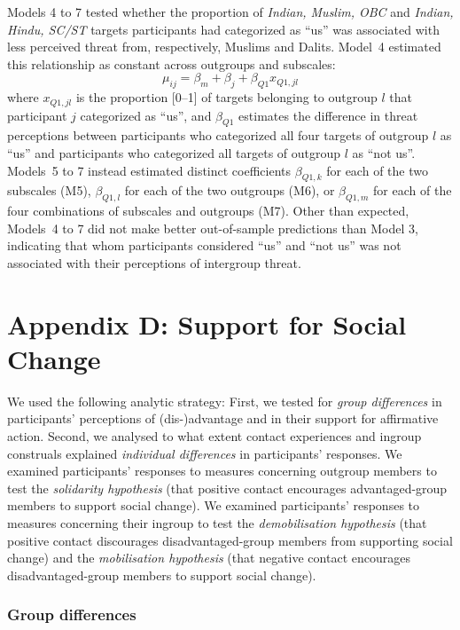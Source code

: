 \documentclass[12pt, a4paper]{article}
\begin{document}
Models 4 to 7 tested whether the proportion of \emph{Indian, Muslim, OBC} and \emph{Indian, Hindu, SC/ST} targets participants had categorized as ``us'' was associated with less perceived threat from, respectively, Muslims and Dalits. Model~4 estimated this relationship as constant across outgroups and subscales: $$ \mu_{ij} = \beta_m + \beta_{j} + \beta_{Q1}x_{Q1,jl} $$ where $x_{Q1,jl}$ is the proportion [0--1] of targets belonging to outgroup $l$ that participant $j$ categorized as ``us'', and $\beta_{Q1}$ estimates the difference in threat perceptions between participants who categorized all four targets of outgroup $l$ as ``us'' and participants who categorized all targets of outgroup $l$ as ``not us''. Models~5 to 7 instead estimated distinct coefficients $\beta_{Q1,k}$ for each of the two subscales (M5), $\beta_{Q1,l}$ for each of the two outgroups (M6), or $\beta_{Q1,m}$ for each of the four combinations of subscales and outgroups (M7). Other than expected, Models~4 to 7 did not make better out-of-sample predictions than Model 3, indicating that whom participants considered ``us'' and ``not us'' was not associated with their perceptions of intergroup threat.

\section{Appendix D: Support for Social Change}

We used the following analytic strategy: First, we tested for \emph{group differences} in participants' perceptions of (dis-)advantage and in their support for affirmative action. Second, we analysed to what extent contact experiences and ingroup construals explained \emph{individual differences} in participants' responses. We examined participants' responses to measures concerning outgroup members to test the \emph{solidarity hypothesis} (that positive contact encourages advantaged-group members to support social change). We examined participants' responses to measures concerning their ingroup to test the \emph{demobilisation hypothesis} (that positive contact discourages disadvantaged-group members from supporting social change) and the \emph{mobilisation hypothesis} (that negative contact encourages disadvantaged-group members to support social change).

\subsubsection{Group differences}
\end{document}
